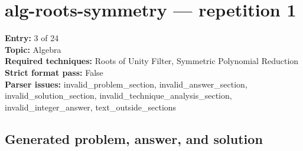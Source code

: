 \documentclass[11pt]{article}
\begin{document}
\section{alg-roots-symmetry --- repetition 1}
{\color{metadata}
\textbf{Entry:} 3 of 24\\
\textbf{Topic:} Algebra\\
\textbf{Required techniques:} Roots of Unity Filter, Symmetric Polynomial Reduction\\
\textbf{Strict format pass:} False\\
\textbf{Parser issues:} invalid\_problem\_section, invalid\_answer\_section, invalid\_solution\_section, invalid\_technique\_analysis\_section, invalid\_integer\_answer, text\_outside\_sections
}

\subsection*{Generated problem, answer, and solution}
\end{document}
